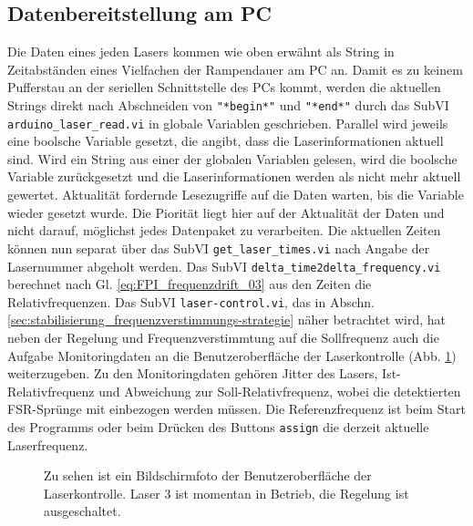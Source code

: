 \subsection{Datenbereitstellung am PC}\label{subsec:datenbereitstellung}
Die Daten eines jeden Lasers kommen wie oben erwähnt als String in Zeitabständen
eines Vielfachen der Rampendauer am PC an. Damit es zu keinem Pufferstau an
der seriellen Schnittstelle des PCs kommt, werden die aktuellen Strings direkt
nach Abschneiden von \lstinline|"*begin*"| und \lstinline|"*end*"| durch das
SubVI \lstinline|arduino_laser_read.vi| in globale Variablen geschrieben.
Parallel wird jeweils eine boolsche Variable gesetzt, die angibt, dass die Laserinformationen aktuell sind. Wird ein String aus einer der
globalen Variablen gelesen, wird die boolsche Variable zurückgesetzt und die
Laserinformationen werden als nicht mehr aktuell gewertet. Aktualität fordernde
Lesezugriffe auf die Daten warten, bis die Variable wieder gesetzt wurde. Die
Piorität liegt hier auf der Aktualität der Daten und nicht darauf, möglichst
jedes Datenpaket zu verarbeiten. Die aktuellen Zeiten können nun separat über
das SubVI \lstinline|get_laser_times.vi| nach Angabe der Lasernummer abgeholt werden. Das SubVI \lstinline|delta_time2delta_frequency.vi| berechnet nach Gl. \eqref{eq:FPI_frequenzdrift_03} aus den Zeiten die Relativfrequenzen. Das SubVI \lstinline|laser-control.vi|, das in Abschn.
\ref{sec:stabilisierung_frequenzverstimmungs-strategie} näher betrachtet wird, hat neben der Regelung und Frequenzverstimmtung auf die Sollfrequenz auch die Aufgabe
Monitoringdaten an die Benutzeroberfläche der Laserkontrolle (Abb.
\ref{fig:benutzeroberflaeche_laserkontrolle}) weiterzugeben. Zu den
Monitoringdaten gehören Jitter des Lasers, Ist-Relativfrequenz und Abweichung
zur Soll-Relativfrequenz, wobei die detektierten FSR-Sprünge mit einbezogen
werden müssen. Die Referenzfrequenz ist beim Start des Programms oder beim
Drücken des Buttons \lstinline|assign| die derzeit aktuelle Laserfrequenz.
\begin{figure}[h]
 	\centering
	\caption[Benutzeroberfläche -
	Laserkontrolle]{Zu sehen ist ein Bildschirmfoto der Benutzeroberfläche
	der Laserkontrolle. Laser 3 ist
	momentan in Betrieb, die
	Regelung ist ausgeschaltet.}\label{fig:benutzeroberflaeche_laserkontrolle}
\end{figure}

